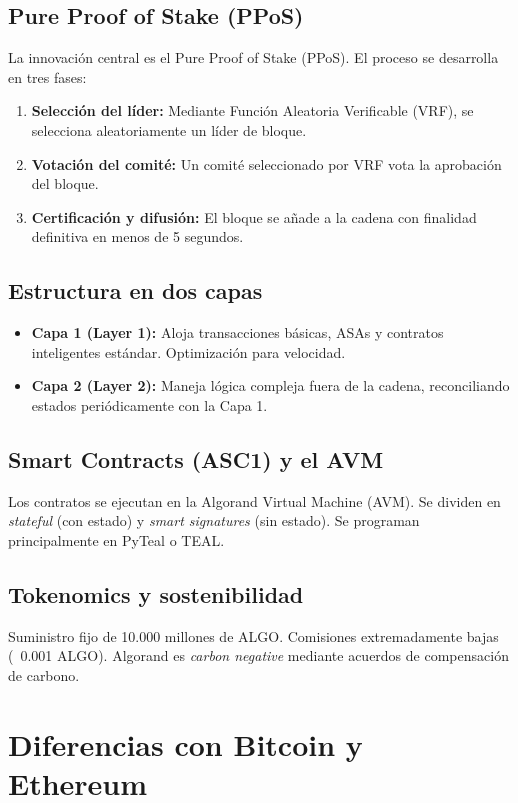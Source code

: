 \documentclass[12pt]{article}
\begin{document}
\subsection{Pure Proof of Stake (PPoS)}
La innovación central es el Pure Proof of Stake (PPoS). El proceso se desarrolla en tres fases:
\begin{enumerate}
    \item \textbf{Selección del líder:} Mediante Función Aleatoria Verificable (VRF), se selecciona aleatoriamente un líder de bloque.
    \item \textbf{Votación del comité:} Un comité seleccionado por VRF vota la aprobación del bloque.
    \item \textbf{Certificación y difusión:} El bloque se añade a la cadena con finalidad definitiva en menos de 5 segundos.
\end{enumerate}

\subsection{Estructura en dos capas}
\begin{itemize}
    \item \textbf{Capa 1 (Layer 1):} Aloja transacciones básicas, ASAs y contratos inteligentes estándar. Optimización para velocidad.
    \item \textbf{Capa 2 (Layer 2):} Maneja lógica compleja fuera de la cadena, reconciliando estados periódicamente con la Capa 1.
\end{itemize}

\subsection{Smart Contracts (ASC1) y el AVM}
Los contratos se ejecutan en la Algorand Virtual Machine (AVM). Se dividen en \textit{stateful} (con estado) y \textit{smart signatures} (sin estado). Se programan principalmente en PyTeal o TEAL.

\subsection{Tokenomics y sostenibilidad}
Suministro fijo de 10.000 millones de ALGO. Comisiones extremadamente bajas (~0.001 ALGO). Algorand es \textit{carbon negative} mediante acuerdos de compensación de carbono.

\section{Diferencias con Bitcoin y Ethereum}
\end{document}

